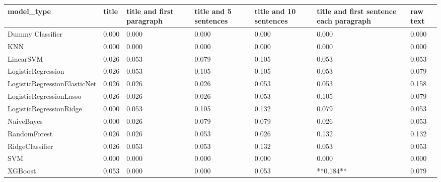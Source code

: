 \begin{tabular}{lllllll}
\toprule
                  model\_type & title & title and first paragraph & title and 5 sentences & title and 10 sentences & title and first sentence each paragraph & raw text \\
\midrule
            Dummy Classifier & 0.000 &                     0.000 &                 0.000 &                  0.000 &                                   0.000 &    0.000 \\
                         KNN & 0.000 &                     0.000 &                 0.000 &                  0.000 &                                   0.000 &    0.000 \\
                   LinearSVM & 0.026 &                     0.053 &                 0.079 &                  0.105 &                                   0.053 &    0.053 \\
          LogisticRegression & 0.026 &                     0.053 &                 0.105 &                  0.105 &                                   0.053 &    0.079 \\
LogisticRegressionElasticNet & 0.026 &                     0.026 &                 0.026 &                  0.053 &                                   0.053 &    0.158 \\
     LogisticRegressionLasso & 0.026 &                     0.026 &                 0.026 &                  0.053 &                                   0.105 &    0.079 \\
     LogisticRegressionRidge & 0.000 &                     0.053 &                 0.105 &                  0.132 &                                   0.079 &    0.053 \\
                  NaiveBayes & 0.000 &                     0.026 &                 0.079 &                  0.079 &                                   0.026 &    0.053 \\
                RandomForest & 0.026 &                     0.026 &                 0.053 &                  0.026 &                                   0.132 &    0.132 \\
             RidgeClassifier & 0.026 &                     0.053 &                 0.053 &                  0.132 &                                   0.053 &    0.053 \\
                         SVM & 0.000 &                     0.000 &                 0.000 &                  0.000 &                                   0.000 &    0.000 \\
                     XGBoost & 0.053 &                     0.000 &                 0.000 &                  0.053 &                               **0.184** &    0.079 \\
\bottomrule
\end{tabular}
